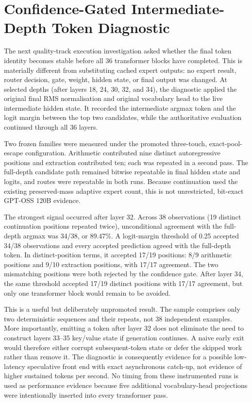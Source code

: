 \section{Confidence-Gated Intermediate-Depth Token Diagnostic}
\label{sec:intermediate-depth-diagnostic}

The next quality-track execution investigation asked whether the final token identity becomes
stable before all 36 transformer blocks have completed.  This is materially
different from substituting cached expert outputs: no expert result, router
decision, gate, weight, hidden state, or final output was changed.  At selected
depths (after layers 18, 24, 30, 32, and 34), the diagnostic applied the original
final RMS normalisation and original vocabulary head to the live intermediate
hidden state.  It recorded the intermediate argmax token and the logit margin
between the top two candidates, while the authoritative evaluation continued
through all 36 layers.

Two frozen families were measured under the promoted three-touch, exact-pool-
escape configuration.  Arithmetic contributed nine distinct autoregressive
positions and extraction contributed ten; each was repeated in a second pass.
The full-depth candidate path remained bitwise repeatable in final hidden state
and logits, and routes were repeatable in both runs.  Because continuation used
the existing preserved-mass adaptive expert count, this is not unrestricted,
bit-exact GPT-OSS 120B evidence.

The strongest signal occurred after layer 32.  Across 38 observations (19
distinct continuation positions repeated twice), unconditional agreement with
the full-depth argmax was 34/38, or 89.47\%.  A logit-margin threshold of 0.25
accepted 34/38 observations and every accepted prediction agreed with the
full-depth token.  In distinct-position terms, it accepted 17/19 positions:
8/9 arithmetic positions and 9/10 extraction positions, with 17/17 agreement.
The two mismatching positions were both rejected by the confidence gate.  After
layer 34, the same threshold accepted 17/19 distinct positions with 17/17
agreement, but only one transformer block would remain to be avoided.

This is a useful but deliberately unpromoted result.  The sample comprises only
two deterministic sequences and their repeats, not 38 independent examples.
More importantly, emitting a token after layer 32 does not eliminate the need to
construct layers 33--35 key/value state if generation continues.  A naive early
exit would therefore either corrupt subsequent-token state or defer the skipped
work rather than remove it.  The diagnostic is consequently evidence for a
possible low-latency speculative front end with exact asynchronous catch-up, not
evidence of higher sustained tokens per second.  No timing from these instrumented
runs is used as performance evidence because five additional vocabulary-head
projections were intentionally inserted into every transformer pass.

